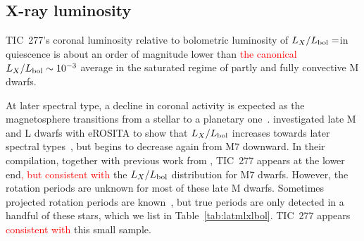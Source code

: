 \documentclass[twocolumn]{aastex631}
\begin{document}
\subsection{X-ray luminosity}
\label{sec:discussion:xraylum}


TIC~277's coronal luminosity relative to bolometric luminosity of $L_X/L_{\rm bol}=$\LXLbol in quiescence is about an order of magnitude lower than \textcolor{red}{the canonical} $L_X/L_{\rm bol}\sim 10^{-3}$ average in the saturated regime of partly and fully convective M dwarfs\citep{wright2011stellaractivityrotation,wright2016solartype,wright2018stellar}.%

At later spectral type, a decline in coronal activity is expected as the magnetosphere transitions from a stellar to a planetary one~\citep{pineda2017panchromatic}. \citet{stelzer2022first} investigated late M and L dwarfs with eROSITA to show that $L_X/L_{\rm bol}$ increases towards later spectral types~\citep{magaudda2022firsta}, but begins to decrease again from M7 downward. In their compilation, together with previous work from \citet{stelzer2012ultracool, cook2014trends, deluca2020extras, williams2014trends, berger2008simultaneous}, TIC~277 appears at the lower end\textcolor{red}{, but consistent with} the $L_X/L_{\rm bol}$ distribution for M7 dwarfs. However, the rotation periods are unknown for most of these late M dwarfs. Sometimes projected rotation periods are known~\citep{cook2014trends}, but true periods are only detected in a handful of these stars, which we list in Table~\ref{tab:latmlxlbol}. TIC~277 appears \textcolor{red}{consistent with} this small sample.
\end{document}
